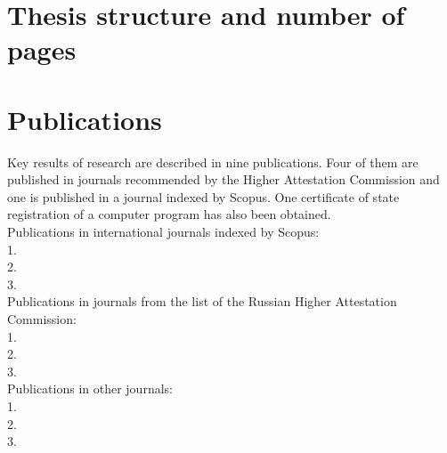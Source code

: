 \section*{Thesis structure and number of pages}
\section*{Publications}
Key results of research are described in nine publications. Four of them are published in journals recommended by the Higher Attestation Commission and one is published in a journal indexed by Scopus. One certificate of state registration of a computer program has also been obtained.\\

Publications in international journals indexed by Scopus:\\
1.\\
2.\\
3.\\

Publications in journals from the list of the Russian Higher Attestation Commission:\\
1.\\
2.\\
3.\\

Publications in other journals:\\
1.\\
2.\\
3.

